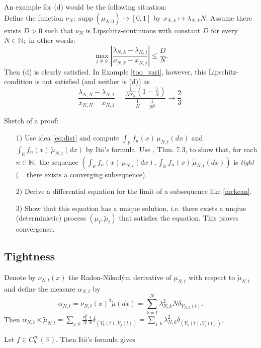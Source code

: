 \documentclass[a4paper,twoside,11pt]{article}
\theoremstyle{plain}
\theoremstyle{definition}
\theoremstyle{remark}
\newcommand\R{\mathbb R}         %
\newcommand\N{\mathbb N}         %
\newcommand{\supp}{\operatorname{supp}}
\begin{document}
An example for (d) would be the following situation:\\
 Define the function $\nu_N:\supp(\mu_{N,0})\to[0,1]$ by $x_{N,k}\mapsto \lambda_{N,k}N$. Assume there exists $D>0$ such that $\nu_N$ is Lipschitz-continuous with constant $D$ for every $N\in\N;$ in other words:
$$ \max_{j\not=k} \left|\frac{\lambda_{N,k}-\lambda_{N,j}}{x_{N,k}-x_{N,j}}\right| \leq \frac{D}{N}. $$ 
Then (d) is clearly satisfied. In Example \ref{too_vari}, however, this Lipschitz-condition is not satisfied (and neither is (d)) as 
$$\frac{\lambda_{N,N}-\lambda_{N,1}}{x_{N,N}-x_{N,1}} = \frac{\frac1{NS_N}(1-\frac1{N})}{\frac1{N}-\frac1{N^2}}\to \frac2{3}.$$


Sketch of a proof:
\begin{itemize}
\item[1)] Use idea \eqref{eq:dist} and compute $\int_\R f_n(x) \, \mu_{N,t}(dx)$ and $\int_\R f_n(x) \, \tilde{\mu}_{N,t}(dx)
$ by It\={o}'s formula. Use \cite{MR1700749}, Thm. 7.3, to show that, for each $n\in\N,$ the sequence $(\int_\R f_n(x) \, \mu_{N,t}(dx), \int_\R f_n(x) \, \tilde{\mu}_{N,t}(dx))$ is \emph{tight} (= there exists a converging subsequence).  
\item[2)] Derive a differential equation for the limit of a subsequence like \eqref{mckean}.
\item[3)] Show that this equation has a unique solution, i.e. there exists a unqiue (deterministic) process $(\mu_t, \tilde{\mu}_t)$ that satisfies the equation. This proves convergence.
\end{itemize}

\subsection{Tightness}

Denote by $\nu_{N,t}(x)$ the Radon-Nikod\'{y}m derivative of $\mu_{N,t}$ with respect to $\tilde{\mu}_{N,t}$ and define the measure $\alpha_{N,t}$ by
$$\alpha_{N,t} =  \nu_{N,t}(x)^2 \tilde{\mu}(dx) = \sum_{k=1}^N \lambda_{N,k}^2N \delta_{V_{N,k}(t)}.$$
Then $\alpha_{N,t}\times \tilde{\mu}_{N,t} = \sum_{j,k} \frac{\nu_k^2}{N} \frac1{N} \delta_{(V_k(t), V_j(t))} = \sum_{j,k} \lambda_{N,k}^2 \delta_{(V_k(t), V_j(t))}$.
 
Let $f\in C^\infty_b(\R).$ Then It\={o}'s formula gives
\end{document}
